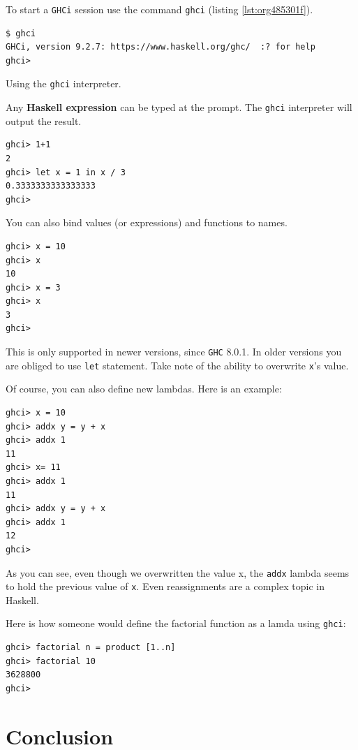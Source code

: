\documentclass[a4paper, titlepage, twoside]{article}
\begin{document}
To start a \texttt{GHCi} session use the command \texttt{ghci} (listing \ref{lst:org485301f}).

\begin{listing}[H]
\begin{verbatim}
$ ghci
GHCi, version 9.2.7: https://www.haskell.org/ghc/  :? for help
ghci>
\end{verbatim}
\caption{\label{lst:org485301f}Using the \texttt{ghci} interpreter.}
\end{listing}

Any \textbf{Haskell expression} can be typed at the prompt. The \texttt{ghci} interpreter will output the result.

\begin{verbatim}
ghci> 1+1
2
ghci> let x = 1 in x / 3
0.3333333333333333
ghci>
\end{verbatim}

You can also bind values (or expressions) and functions to names.

\begin{verbatim}
ghci> x = 10
ghci> x
10
ghci> x = 3
ghci> x
3
ghci>
\end{verbatim}

This is only supported in newer versions, since \texttt{GHC} 8.0.1. In older versions you are obliged to use \texttt{let} statement. Take note of the ability to overwrite \texttt{x}'s value.

Of course, you can also define new lambdas. Here is an example:

\begin{verbatim}
ghci> x = 10
ghci> addx y = y + x
ghci> addx 1
11
ghci> x= 11
ghci> addx 1
11
ghci> addx y = y + x
ghci> addx 1
12
ghci> 
\end{verbatim}

As you can see, even though we overwritten the value x, the \texttt{addx} lambda seems to hold the previous value of \texttt{x}. Even reassignments are a complex topic in Haskell.

Here is how someone would define the factorial function as a lamda using \texttt{ghci}:

\begin{verbatim}
ghci> factorial n = product [1..n]
ghci> factorial 10
3628800
ghci>
\end{verbatim}

\section{Conclusion}
\label{sec:org8053550}
\end{document}
